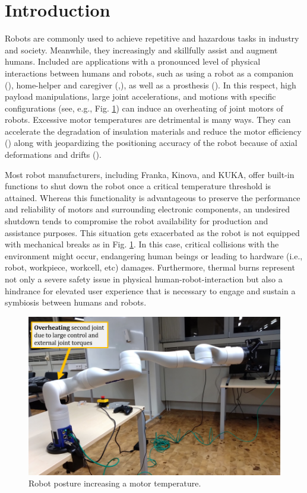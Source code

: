 \documentclass{ifacconf}
\begin{document}
\section{Introduction}
Robots are commonly used to  achieve repetitive and hazardous tasks in industry and society. Meanwhile, they increasingly and skillfully assist and augment humans. Included are  applications with a pronounced level of physical interactions between humans and robots, such as using a robot as a companion (\cite{basha2025robotic}), home-helper and caregiver (\cite{tsui2025exploring},\cite{gkiolnta2025challenges}), as well as a prosthesis (\cite{kim2025mode}). In this respect, high payload manipulations, large joint accelerations, and motions with specific configurations (see, e.g., Fig. \ref{fig:intro}) can induce an overheating of  joint motors of robots. Excessive motor temperatures are detrimental is many ways. They can accelerate the degradation of insulation materials and reduce the motor efficiency (\cite{yehorov2025study}) along with jeopardizing the positioning accuracy of the robot because of axial  deformations and drifts (\cite{soga2024skillful}). 



Most robot manufacturers, including Franka, Kinova, and KUKA, offer built-in functions to shut down the robot once a critical temperature threshold is attained. Whereas this functionality is advantageous to preserve the performance and reliability of motors and surrounding electronic components, an undesired shutdown tends to compromise the robot availability for production and assistance purposes. This situation gets exacerbated as the robot is not equipped with mechanical breaks as in Fig. \ref{fig:intro}. In this case, critical collisions with the environment might occur, endangering human beings or leading to hardware (i.e., robot, workpiece, workcell, etc) damages. Furthermore, thermal burns represent  not only  a severe safety issue in physical human-robot-interaction but also a hindrance for elevated user experience that is necessary to engage and sustain a symbiosis between humans and robots.

\begin{figure}[t]
	\centerline{\includegraphics[width=0.8\columnwidth]{pictures/intro.png}}
	\caption{Robot posture increasing a motor temperature.}
	\label{fig:intro}
\end{figure}
\end{document}
